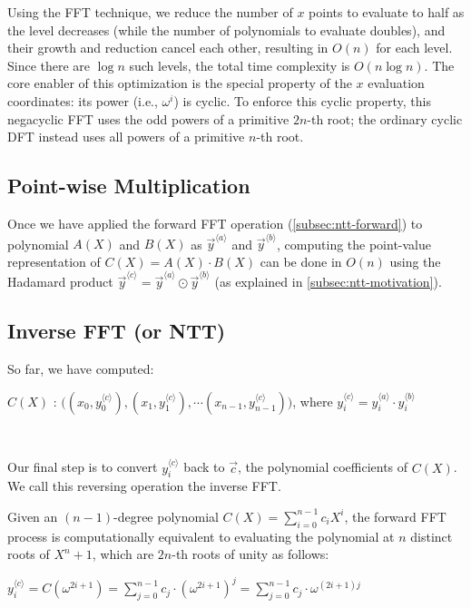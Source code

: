Using the FFT technique, we reduce the number of $x$ points to evaluate to half as the level decreases (while the number of polynomials to evaluate doubles), and their growth and reduction cancel each other, resulting in $O(n)$ for each level. Since there are $\log n$ such levels, the total time complexity is $O(n \log n)$. The core enabler of this optimization is the special property of the $x$ evaluation coordinates: its power (i.e., $\omega^i$) is cyclic. To enforce this cyclic property, this negacyclic FFT uses the odd powers of a primitive $2n$-th root; the ordinary cyclic DFT instead uses all powers of a primitive $n$-th root.


\subsection{Point-wise Multiplication}
\label{subsec:pointwise-multiplication}

Once we have applied the forward FFT operation (\autoref{subsec:ntt-forward}) to polynomial $A(X)$ and $B(X)$ as $\vec{y}^{\langle a \rangle}$ and $\vec{y}^{\langle b \rangle}$, computing the point-value representation of $C(X) = A(X) \cdot B(X)$ can be done in $O(n)$ using the Hadamard product $ \vec{y}^{\langle c \rangle} = \vec{y}^{\langle a \rangle} \odot \vec{y}^{\langle b \rangle}$ (as explained in \autoref{subsec:ntt-motivation}).

\subsection{Inverse FFT (or NTT)}
\label{subsec:ntt-backward}

So far, we have computed:

$C(X)$ : $\bm ( ({x}_0, {y}_0^{\langle c \rangle}), ({x}_1, {y}_1^{\langle c \rangle}), \cdots ({x}_{n-1}, {y}_{n-1}^{\langle c \rangle}) \bm )$, where ${y}_i^{\langle c \rangle} = {y}_i^{\langle a \rangle} \cdot {y}_i^{\langle b \rangle}$

$ $

Our final step is to convert ${y}_i^{\langle c \rangle}$ back to $\vec{c}$, the polynomial coefficients of $C(X)$. We call this reversing operation the inverse FFT. 

Given an $(n-1)$-degree polynomial 
$C(X) = \sum\limits_{i=0}^{n-1}c_iX^i$, the forward FFT process is computationally equivalent to evaluating the polynomial at $n$ distinct roots of $X^n + 1$, which are $2n$-th roots of unity as follows:

${y}_i^{\langle c \rangle} = C(\omega^{2i+1}) = \sum\limits_{j=0}^{n-1}c_{j}\cdot (\omega^{2i + 1})^j = \sum\limits_{j=0}^{n-1}c_{j}\cdot \omega^{(2i+1)j}$

